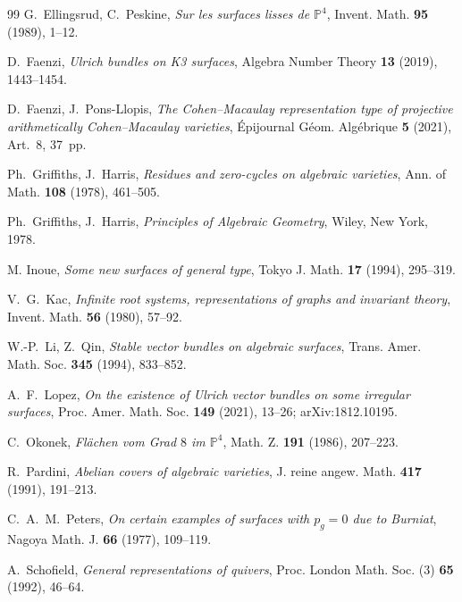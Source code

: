 \documentclass{amsart}
\theoremstyle{definition}
\newcommand{\PP}{\mathbb{P}}
\begin{document}
\begin{thebibliography}{99}
G.~Ellingsrud, C.~Peskine,
\emph{Sur les surfaces lisses de $\PP^4$},
Invent. Math. \textbf{95} (1989), 1--12.

D.~Faenzi,
\emph{Ulrich bundles on K3 surfaces},
Algebra Number Theory \textbf{13} (2019), 1443--1454.

D.~Faenzi, J.~Pons-Llopis,
\emph{The Cohen--Macaulay representation type of projective arithmetically Cohen--Macaulay varieties},
\'Epijournal G\'eom. Alg\'ebrique \textbf{5} (2021), Art.~8, 37~pp.

Ph.~Griffiths, J.~Harris,
\emph{Residues and zero-cycles on algebraic varieties},
Ann. of Math. \textbf{108} (1978), 461--505.

Ph.~Griffiths, J.~Harris,
\emph{Principles of Algebraic Geometry},
Wiley, New York, 1978.

M. Inoue, \emph{Some new surfaces of general type}, Tokyo J. Math. \textbf{17} (1994), 295--319.

V.~G.~Kac,
\emph{Infinite root systems, representations of graphs and invariant theory},
Invent. Math. \textbf{56} (1980), 57--92.

W.-P.~Li, Z.~Qin,
\emph{Stable vector bundles on algebraic surfaces},
Trans. Amer. Math. Soc. \textbf{345} (1994), 833--852.

A.~F.~Lopez,
\emph{On the existence of Ulrich vector bundles on some irregular surfaces},
Proc. Amer. Math. Soc. \textbf{149} (2021), 13--26; arXiv:1812.10195.

C.~Okonek,
\emph{Fl\"achen vom Grad $8$ im $\PP^4$},
Math. Z. \textbf{191} (1986), 207--223.

R.~Pardini,
\emph{Abelian covers of algebraic varieties},
J. reine angew. Math. \textbf{417} (1991), 191--213.

C.~A.~M.~Peters,
\emph{On certain examples of surfaces with $p_g=0$ due to Burniat},
Nagoya Math. J. \textbf{66} (1977), 109--119.

A.~Schofield,
\emph{General representations of quivers},
Proc. London Math. Soc. (3) \textbf{65} (1992), 46--64.

\end{thebibliography}
\end{document}
